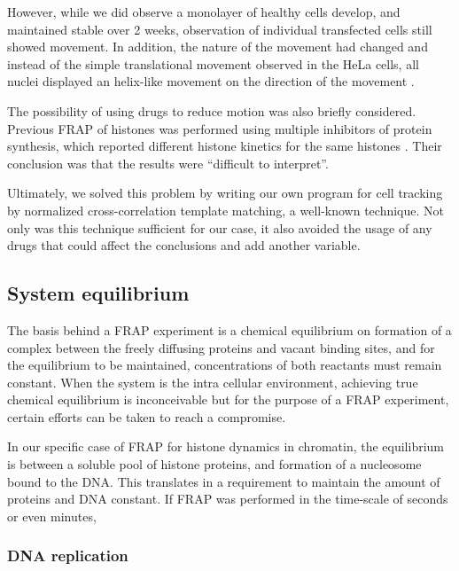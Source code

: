     However, while we did observe a monolayer of healthy cells develop,
    and maintained stable over 2 weeks, observation of individual transfected
    cells still showed movement. In addition, the nature of the movement
    had changed and instead of the simple translational movement observed
    in the HeLa cells, all nuclei displayed an helix-like movement on the
    direction of the movement .

    The possibility of using drugs to reduce motion was also briefly
    considered. Previous FRAP of histones was performed using
    multiple inhibitors of protein synthesis, which reported different
    histone kinetics for the same histones \citep{KimuraCook}. Their
    conclusion was that the results were ``difficult to interpret''.

    Ultimately, we solved this problem by writing our own program
    for cell tracking by normalized cross-correlation template matching, a
    well-known technique. Not only was this technique sufficient for our
    case, it also avoided the usage of any drugs that could affect the
    conclusions and add another variable.


  \subsection{System equilibrium}

    The basis behind a FRAP experiment is a chemical equilibrium on
    formation of a complex between the freely diffusing proteins and
    vacant binding sites, and for the equilibrium to be maintained,
    concentrations of both reactants must remain constant.
    When the system is the intra cellular environment, achieving
    true chemical equilibrium is inconceivable but for the purpose
    of a FRAP experiment, certain efforts can be taken to reach a
    compromise.

    In our specific case of FRAP for histone
    dynamics in chromatin, the equilibrium is between
    a soluble pool of histone proteins, and formation of a nucleosome
    bound to the DNA. This translates in a requirement to maintain the
    amount of proteins and DNA constant. If FRAP was performed in the
    time-scale of seconds or even minutes,

    \subsubsection{DNA replication}

